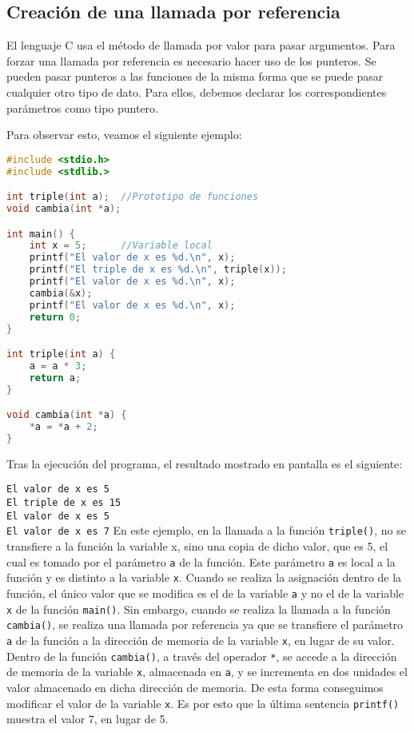 \subsection{Creación de una llamada por referencia}{
El lenguaje C usa el método de llamada por valor para pasar argumentos. Para forzar una llamada por referencia es necesario hacer uso de los punteros. Se pueden pasar punteros a las funciones de la misma forma que se puede pasar cualquier otro tipo de dato. Para ellos, debemos declarar los correspondientes parámetros como tipo puntero.

Para observar esto, veamos el siguiente ejemplo:
\begin{Ejemplo}
\begin{lstlisting}[language=C]
#include <stdio.h>
#include <stdlib.>

int triple(int a);	//Prototipo de funciones
void cambia(int *a);

int main() {
    int x = 5;		//Variable local
    printf("El valor de x es %d.\n", x);
    printf("El triple de x es %d.\n", triple(x));
    printf("El valor de x es %d.\n", x);
    cambia(&x);
    printf("El valor de x es %d.\n", x);
    return 0;
}

int triple(int a) {
    a = a * 3;
    return a;
}

void cambia(int *a) {
    *a = *a + 2;
}
\end{lstlisting}
Tras la ejecución del programa, el resultado mostrado en pantalla es el siguiente:

\texttt{El valor de x es 5}\\
\texttt{El triple de x es 15}\\
\texttt{El valor de x es 5}\\
\texttt{El valor de x es 7}
\Explicacion
En este ejemplo, en la llamada a la función \texttt{triple()}, no se transfiere a la función la variable x, sino una copia de dicho valor, que es 5, el cual es tomado por el parámetro \texttt{a} de la función. Este parámetro \texttt{a} es local a la función y es distinto a la variable \texttt{x}. Cuando se realiza la asignación dentro de la función, el único valor que se modifica es el de la variable \texttt{a} y no el de la variable \texttt{x} de la función \texttt{main()}. Sin embargo, cuando se realiza la llamada a la función \texttt{cambia()}, se realiza una llamada por referencia ya que se transfiere el parámetro \texttt{a} de la función a la dirección de memoria de la variable \texttt{x}, en lugar de su valor. Dentro de la función \texttt{cambia()}, a través del operador \texttt{*}, se accede a la dirección de memoria de la variable \texttt{x}, almacenada en \texttt{a}, y se incrementa en dos unidades el valor almacenado en dicha dirección de memoria. De esta forma conseguimos modificar el valor de la variable \texttt{x}. Es por esto que la última sentencia \texttt{printf()} muestra el valor 7, en lugar de 5.
\end{Ejemplo}
}
